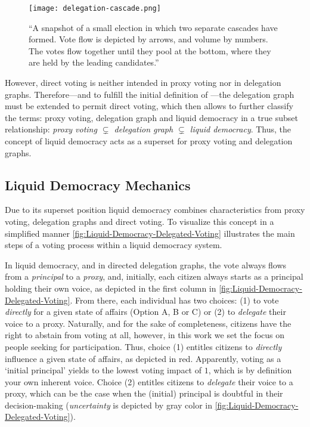 \begin{figure}[H]
\centering
\texttt{[image: delegation-cascade.png]}
	\caption[Delegate cascade voting]{“A snapshot of a small election in which two separate cascades have formed. Vote flow is depicted by arrows, and volume by numbers. The votes flow together until they pool at the bottom, where they are held by the leading candidates.” \parencite{Allen2008}}
	\label{fig:Delegation-Cascade}
\end{figure}
However, direct voting is neither intended in proxy voting nor in delegation graphs. Therefore---and to fulfill the initial definition of ---the delegation graph must be extended to permit direct voting, which then allows to further classify the terms: proxy voting, delegation graph and liquid democracy in a true subset relationship: \textit{proxy voting \(\subsetneq\) delegation graph \(\subsetneq\) liquid democracy}. Thus, the concept of liquid democracy acts as a superset for proxy voting and delegation graphs. 

\subsection{Liquid Democracy Mechanics}
\label{ssec:Liquid_Democracy_Mechanics}

Due to its superset position liquid democracy combines characteristics from proxy voting, delegation graphs and direct voting. To visualize this concept in a simplified manner \autoref{fig:Liquid-Democracy-Delegated-Voting} illustrates the main steps of a voting process within a liquid democracy system.

In liquid democracy, and in directed delegation graphs, the vote always flows from a \textit{principal} to a \textit{proxy}, and, initially, each citizen always starts as a  principal holding their own voice, as depicted in the first column in \autoref{fig:Liquid-Democracy-Delegated-Voting}. From there, each individual has two choices: (1) to vote \textit{directly} for a given state of affairs (Option A, B or C) or (2) to \textit{delegate} their voice to a 
proxy. Naturally, and for the sake of completeness, citizens have the right to abstain from voting at all, however, in this work we set the focus on people seeking for participation. Thus, choice (1) entitles citizens to \textit{directly} influence a given state of affairs, as depicted in red. Apparently, voting as a ‘initial principal’ yields to the lowest voting impact of \(1\), which is by definition your own inherent voice. Choice (2) entitles citizens to \textit{delegate} their voice to a proxy, which can be the case when the (initial) principal is doubtful in their decision-making (\textit{uncertainty} is depicted by gray color in \autoref{fig:Liquid-Democracy-Delegated-Voting}).
% 
% 

